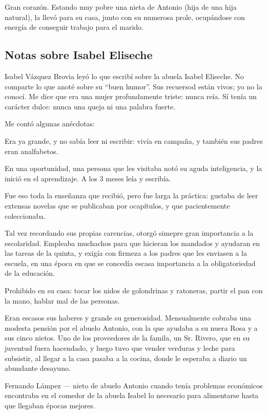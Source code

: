 \documentclass{article}
\begin{document}
Gran corazón. Estando muy pobre una nieta de Antonio (hija de una hija natural), la llevó para su casa, junto con su numerosa prole, ocupándose con energía de conseguir trabajo para el marido.

\subsection{Notas sobre Isabel Eliseche}

Isabel Vázquez Brovia leyó lo que escribí sobre la abuela Isabel Eliseche. No comparte lo que anoté sobre su ``buen humor''. Sus recuersod están vivos; yo no la conocí. Me dice que era una mujer profundamente triste: nunca reía. Sí tenía un carácter dulce: nunca una queja ni una palabra fuerte.

Me contó algunas anécdotas:

\bigbreak{}

Era ya grande, y no sabía leer ni escribir: vivía en campaña, y también sus padres eran analfabetos.

En una oportunidad, una persona que les visitaba notó su aguda inteligencia, y la inició en el aprendizaje. A los 3 meses leía y escribía.

Fue eso toda la enseñanza que recibió, pero fue larga la práctica: gustaba de leer extensas novelas que se publicaban por ocapítulos, y que pacientemente coleccionaba.

Tal vez recordando sus propias carencias, otorgó simepre gran importancia a la escolaridad. Empleaba muchachos para que hicieran los mandados y ayudaran en las tareas de la quinta, y exigía con firmeza a los padres que les enviasen a la escuela, en una época en que se concedía escasa importancia a la obligatoriedad de la educación.

Prohibido en su casa: tocar los nidos de golondrinas y ratoneras, partir el pan con la mano, hablar mal de las personas.

Eran escasos sus haberes y grande su generosidad. Mensualmente cobraba una modesta pensión por el abuelo Antonio, con la que ayudaba a su nuera Rosa y a sus cinco nietos. Uno de los proveedores de la famila, un Sr. Rivero, que en su juventud fuera hacendado, y luego tuvo que vender verduras y leche para subsistir, al llegar a la casa pasaba a la cocina, donde le esperaba a diario un abundante desayuno.

Fernando Lámpez --- nieto de abuelo Antonio cuando tenía problemas e\-co\-nó\-mi\-cos encontraba en el comedor de la abuela Isabel lo necesario para alimentarse hasta que llegaban épocas mejores.
\end{document}
